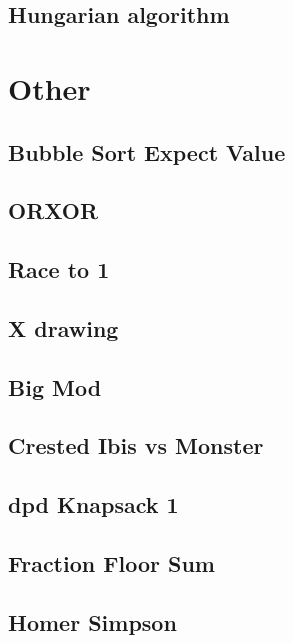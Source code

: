         \subsection{Hungarian algorithm}
                

\section{Other}
        \subsection{Bubble Sort Expect Value}
                
        \subsection{ORXOR}
                
        \subsection{Race to 1}
                
        \subsection{X drawing}
                
        \subsection{Big Mod}
                
        \subsection{Crested Ibis vs Monster}
                
        \subsection{dpd Knapsack 1}
                
        \subsection{Fraction Floor Sum}
                
        \subsection{Homer Simpson}
                
